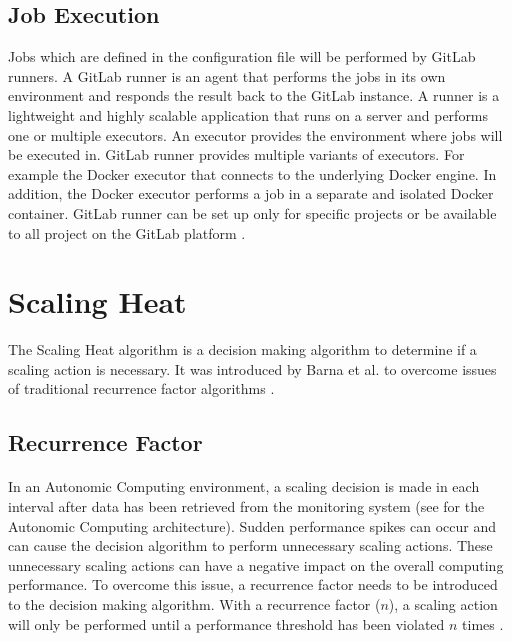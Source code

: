 \subsection{Job Execution}
Jobs which are defined in the configuration file will be performed by GitLab runners.
A GitLab runner is an agent that performs the jobs in its own environment and responds the result back to the GitLab instance. A runner is a lightweight and highly scalable application that runs on a server and performs one or multiple executors.
An executor provides the environment where jobs will be executed in. GitLab runner provides multiple variants of executors.
For example the Docker executor that connects to the underlying Docker engine. In addition, the Docker executor performs a job in a separate and isolated Docker container.
GitLab runner can be set up only for specific projects or be available to all project on the GitLab platform \cite{Gitlab2020Docs}.


\section{Scaling Heat}
\label{sec:04_scal-heat}
The Scaling Heat algorithm is a decision making algorithm to determine if a scaling action is necessary.
It was introduced by Barna et al. \cite{Barna2017ElasticContainerApps} to overcome issues of traditional recurrence factor algorithms \cite{Barna2017ElasticContainerApps}.


\subsection{Recurrence Factor}
\paragraph{}In an Autonomic Computing environment, a scaling decision is made in each interval after data has been retrieved from the monitoring system (see  for the Autonomic Computing architecture). 
Sudden performance spikes can occur and can cause the decision algorithm to perform unnecessary scaling actions.
These unnecessary scaling actions can have a negative impact on the overall computing performance.
To overcome this issue, a recurrence factor needs to be introduced to the decision making algorithm.
With a recurrence factor ($n$), a scaling action will only be performed until a performance threshold has been violated $n$ times \cite{Barna2017ElasticContainerApps}.


